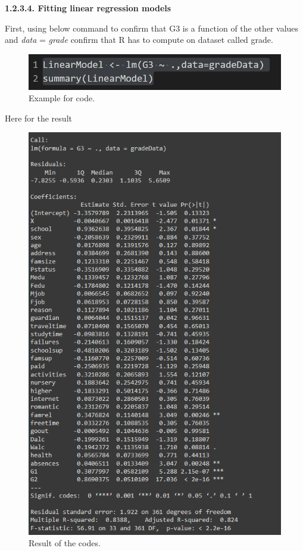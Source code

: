 \documentclass[a4paper]{article}
\begin{document}
\textbf{1.2.3.4. Fitting linear regression models \\ \newline}
First, using below command to confirm that G3 is a function of the other
values and \textit{data} = \textit{grade} confirm that R has to compute on dataset called grade.
\begin{figure}[H]
    \centering
    \includegraphics[scale = 0.8]{Images/43.PNG}
    \caption{Example for code.}
    \label{fig:linear1}
\end{figure}
Here for the result
\begin{figure}[H]
    \centering
    \includegraphics[scale = 1]{Images/44.PNG}
    \caption{Result of the codes.}
    \label{fig:linear2}
\end{figure}
\end{document}
